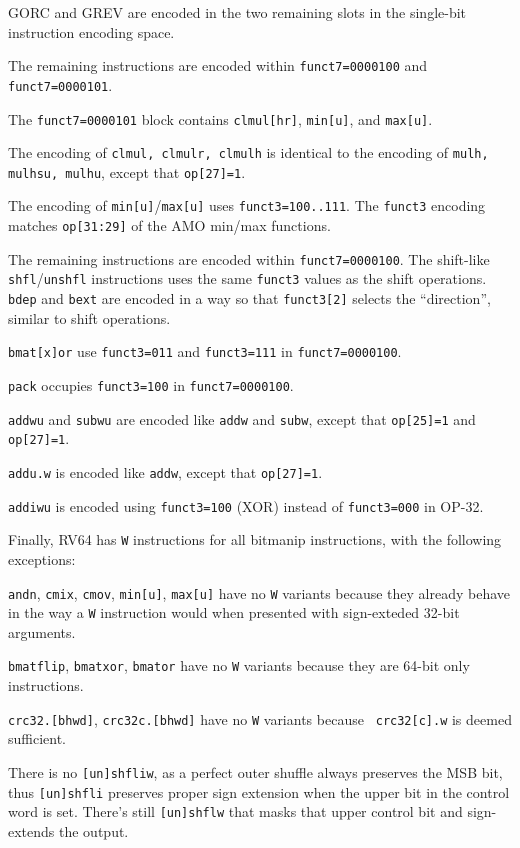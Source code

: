 GORC and GREV are encoded in the two remaining slots in the single-bit
instruction encoding space.

The remaining instructions are encoded within {\tt funct7=0000100} and
{\tt funct7=0000101}.

The {\tt funct7=0000101} block contains {\tt clmul[hr]},
{\tt min[u]}, and {\tt max[u]}.

The encoding of {\tt clmul, clmulr, clmulh} is identical to the encoding of
{\tt mulh, mulhsu, mulhu}, except that {\tt op[27]=1}.

The encoding of {\tt min[u]}/{\tt max[u]} uses {\tt funct3=100..111}. The
{\tt funct3} encoding matches {\tt op[31:29]} of the AMO min/max functions.

The remaining instructions are encoded within {\tt funct7=0000100}. The
shift-like {\tt shfl}/{\tt unshfl} instructions uses the same {\tt funct3}
values as the shift operations. {\tt bdep} and {\tt bext} are encoded in a
way so that {\tt funct3[2]} selects the ``direction'', similar to shift
operations.

{\tt bmat[x]or} use {\tt funct3=011} and {\tt funct3=111} in {\tt funct7=0000100}.

{\tt pack} occupies {\tt funct3=100} in {\tt funct7=0000100}.

{\tt addwu} and {\tt subwu} are encoded like {\tt addw} and {\tt subw}, except
that {\tt op[25]=1} and {\tt op[27]=1}.

{\tt addu.w} is encoded like {\tt addw}, except that {\tt op[27]=1}.

{\tt addiwu} is encoded using {\tt funct3=100} (XOR) instead of {\tt funct3=000} in OP-32.

Finally, RV64 has {\tt *W} instructions for all bitmanip instructions, with the
following exceptions:

{\tt andn}, {\tt cmix}, {\tt cmov}, {\tt min[u]}, {\tt max[u]} have no {\tt *W}
variants because they already behave in the way a {\tt *W} instruction would
when presented with sign-exteded 32-bit arguments.

{\tt bmatflip}, {\tt bmatxor}, {\tt bmator} have no {\tt *W} variants because
they are 64-bit only instructions.

{\tt crc32.[bhwd]}, {\tt crc32c.[bhwd]} have no {\tt *W} variants because {\tt
crc32[c].w} is deemed sufficient.

There is no {\tt [un]shfliw}, as a perfect outer shuffle always preserves the
MSB bit, thus {\tt [un]shfli} preserves proper sign extension when the
upper bit in the control word is set. There's still {\tt [un]shflw} that
masks that upper control bit and sign-extends the output.

